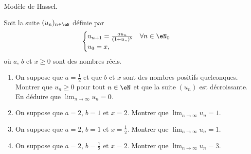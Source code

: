 
\begin{exercice}\label{exoTD3-0009}

	Modèle de Hassel.

	Soit la suite $(u_n)_{n\in\eN}$ définie par
	\begin{equation}
		\begin{cases}
			u_{n+1}=\frac{ au_n }{ (1+u_n)^b }	&	\text{}\forall n\in\eN_0\\
			u_0=x,
		\end{cases}
	\end{equation}
	où $a$, $b$ et $x\geq 0$ sont des nombres réels.
	\begin{enumerate}
		\item
			On suppose que $a=\frac{ 1 }{2}$ et que $b$ et $x$ sont des nombres positifs quelconques. Montrer que $u_n\geq 0$ pour tout $n\in\eN$ et que la suite $(u_n)$ est décroissante. En déduire que $\lim_{n\to\infty}u_n=0$.
		\item
			On suppose que $a=2$, $b=1$ et $x=2$. Montrer que $\lim_{n\to\infty}u_n=1$.
		\item
			On suppose que $a=2$, $b=1$ et $x=\frac{ 1 }{2}$. Montrer que $\lim_{n\to\infty}u_n=1$.
		\item
			On suppose que $a=2$, $b=\frac{ 1 }{2}$ et $x=2$. Montrer que $\lim_{n\to\infty}u_n=3$.
	\end{enumerate}

\end{exercice}
